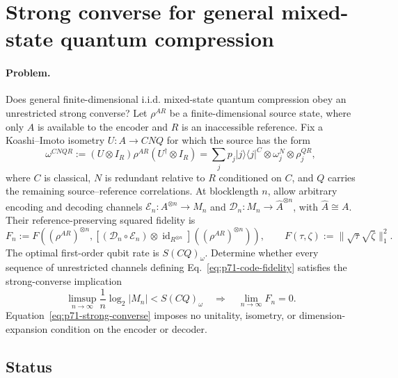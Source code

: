 \section{Strong converse for general mixed-state quantum compression}
\label{sec:problem-71}

\paragraph{Problem.}
Does general finite-dimensional i.i.d. mixed-state quantum compression obey
an unrestricted strong converse?  Let $\rho^{AR}$ be a finite-dimensional
source state, where only $A$ is available to the encoder and $R$ is an
inaccessible reference.  Fix a Koashi--Imoto isometry $U:A\to CNQ$ for which
the source has the form
\begin{equation}
  \omega^{CNQR}
  :=(U\otimes I_R)\rho^{AR}(U^\dagger\otimes I_R)
  =\sum_j p_j|j\rangle\!\langle j|^C
     \otimes\omega_j^N\otimes\rho_j^{QR},
  \label{eq:p71-koashi-imoto}
\end{equation}
where $C$ is classical, $N$ is redundant relative to $R$ conditioned on
$C$, and $Q$ carries the remaining source--reference correlations.  At
blocklength $n$, allow arbitrary encoding and decoding channels
$\mathcal E_n:A^{\otimes n}\to M_n$ and
$\mathcal D_n:M_n\to\widehat A^{\otimes n}$, with
$\widehat A\cong A$.  Their reference-preserving squared fidelity is
\begin{equation}
  F_n:=F\!\left(
    (\rho^{AR})^{\otimes n},
    \left[(\mathcal D_n\circ\mathcal E_n)
      \otimes\operatorname{id}_{R^{\otimes n}}\right]
      ((\rho^{AR})^{\otimes n})
  \right),
  \qquad
  F(\tau,\zeta):=\lVert\sqrt\tau\sqrt\zeta\rVert_1^2.
  \label{eq:p71-code-fidelity}
\end{equation}
The optimal first-order qubit rate is $S(CQ)_\omega$.  Determine whether every
sequence of unrestricted channels defining Eq.~\eqref{eq:p71-code-fidelity}
satisfies the strong-converse implication
\begin{equation}
  \limsup_{n\to\infty}\frac1n\log_2|M_n|<S(CQ)_\omega
  \quad\Longrightarrow\quad
  \lim_{n\to\infty}F_n=0.
  \label{eq:p71-strong-converse}
\end{equation}
Equation~\eqref{eq:p71-strong-converse} imposes no unitality, isometry, or
dimension-expansion condition on the encoder or decoder.

\subsection*{Status}

